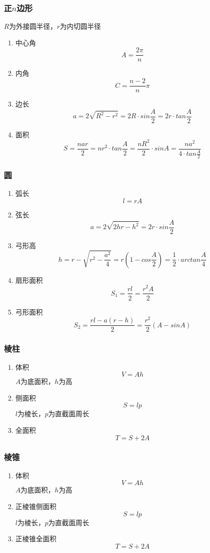 \documentclass[a4paper]{article}
\begin{document}
\subsubsection{正$n$边形}

$R$为外接圆半径，$r$为内切圆半径
\begin{enumerate}
	\item 中心角
		$$A=\frac{2\pi}{n}$$
	\item 内角
		$$C=\frac{n-2}{n}\pi$$
	\item 边长
		$$a=2\sqrt{R^2-r^2}=2R \cdot sin\frac{A}{2}=2r \cdot tan\frac{A}{2}$$
	\item 面积
		$$S=\frac{nar}{2}=nr^2 \cdot tan\frac{A}{2}=\frac{nR^2}{2} \cdot sinA=\frac{na^2}{4 \cdot tan\frac{A}{2}}$$
\end{enumerate}

\subsubsection{圆}

\begin{enumerate}
	\item 弧长
		$$l=rA$$
	\item 弦长
		$$a=2\sqrt{2hr-h^2}=2r\cdot sin\frac{A}{2}$$
	\item 弓形高
		$$h=r-\sqrt{r^2-\frac{a^2}{4}}=r(1-cos\frac{A}{2})=\frac{1}{2} \cdot arctan\frac{A}{4}$$
	\item 扇形面积
		$$S_1=\frac{rl}{2}=\frac{r^2A}{2}$$
	\item 弓形面积
		$$S_2=\frac{rl-a(r-h)}{2}=\frac{r^2}{2}(A-sinA)$$
\end{enumerate}

\subsubsection{棱柱}

\begin{enumerate}
	\item 体积
		$$V=Ah$$
		$A$为底面积，$h$为高
	\item 侧面积
		$$S=lp$$
		$l$为棱长，$p$为直截面周长
	\item 全面积
		$$T=S+2A$$
\end{enumerate}

\subsubsection{棱锥}

\begin{enumerate}
	\item 体积
		$$V=Ah$$
		$A$为底面积，$h$为高
	\item 正棱锥侧面积
		$$S=lp$$
		$l$为棱长，$p$为直截面周长
	\item 正棱锥全面积
		$$T=S+2A$$
\end{enumerate}
\end{document}
